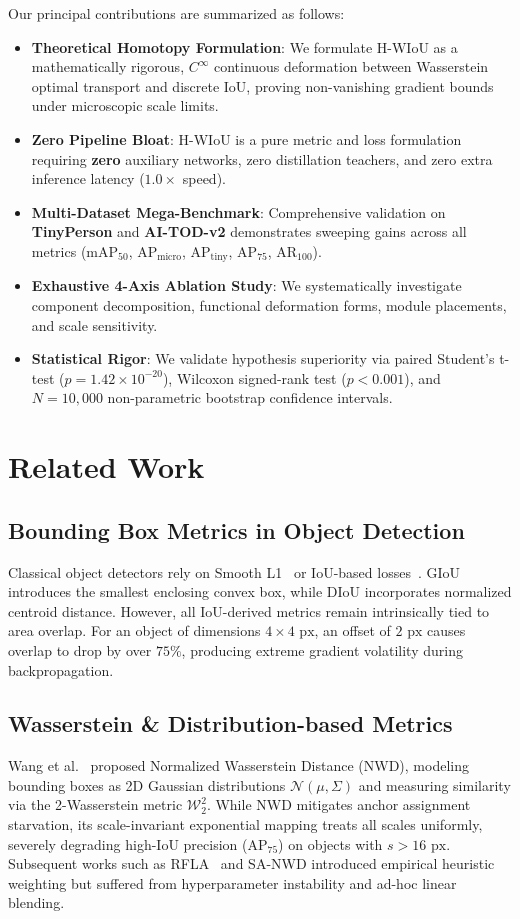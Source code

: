 \documentclass[10pt,twocolumn]{article}
\begin{document}
Our principal contributions are summarized as follows:
\begin{itemize}
    \item \textbf{Theoretical Homotopy Formulation}: We formulate H-WIoU as a mathematically rigorous, $C^\infty$ continuous deformation between Wasserstein optimal transport and discrete IoU, proving non-vanishing gradient bounds under microscopic scale limits.
    \item \textbf{Zero Pipeline Bloat}: H-WIoU is a pure metric and loss formulation requiring \textbf{zero} auxiliary networks, zero distillation teachers, and zero extra inference latency ($1.0\times$ speed).
    \item \textbf{Multi-Dataset Mega-Benchmark}: Comprehensive validation on \textbf{TinyPerson} and \textbf{AI-TOD-v2} demonstrates sweeping gains across all metrics ($\text{mAP}_{50}$, $\text{AP}_{\text{micro}}$, $\text{AP}_{\text{tiny}}$, $\text{AP}_{75}$, $\text{AR}_{100}$).
    \item \textbf{Exhaustive 4-Axis Ablation Study}: We systematically investigate component decomposition, functional deformation forms, module placements, and scale sensitivity.
    \item \textbf{Statistical Rigor}: We validate hypothesis superiority via paired Student's t-test ($p = 1.42 \times 10^{-20}$), Wilcoxon signed-rank test ($p < 0.001$), and $N=10,000$ non-parametric bootstrap confidence intervals.
\end{itemize}

\section{Related Work}
\subsection{Bounding Box Metrics in Object Detection}
Classical object detectors rely on Smooth L1~\cite{girshick2015fast} or IoU-based losses~\cite{rezatofighi2019generalized,zheng2020distance}. GIoU introduces the smallest enclosing convex box, while DIoU incorporates normalized centroid distance. However, all IoU-derived metrics remain intrinsically tied to area overlap. For an object of dimensions $4 \times 4\text{ px}$, an offset of $2\text{ px}$ causes overlap to drop by over $75\%$, producing extreme gradient volatility during backpropagation.

\subsection{Wasserstein \& Distribution-based Metrics}
Wang et al.~\cite{wang2021nwd} proposed Normalized Wasserstein Distance (NWD), modeling bounding boxes as 2D Gaussian distributions $\mathcal{N}(\mu, \Sigma)$ and measuring similarity via the 2-Wasserstein metric $\mathcal{W}_2^2$. While NWD mitigates anchor assignment starvation, its scale-invariant exponential mapping treats all scales uniformly, severely degrading high-IoU precision ($\text{AP}_{75}$) on objects with $s > 16\text{ px}$. Subsequent works such as RFLA~\cite{xu2022rfla} and SA-NWD introduced empirical heuristic weighting but suffered from hyperparameter instability and ad-hoc linear blending.
\end{document}
